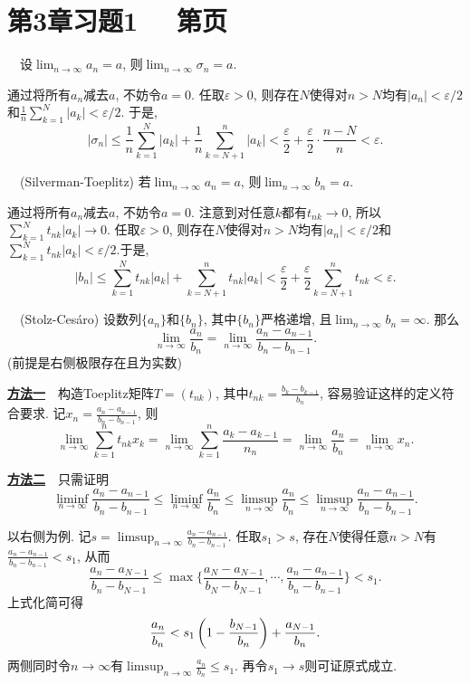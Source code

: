\newpage
\section*{第3章习题1 ~~\small 第\pageref{sec:ex3.1}页}

~~设$\lim_{n\to \infty} a_n=a$, 则$\lim_{n\to \infty} \sigma _n=a$. 

\begin{exsolution}
	通过将所有$a_n$减去$a$, 不妨令$a=0$. 任取$\varepsilon >0$, 则存在$N$使得对$n>N$均有$|a_n|<\varepsilon /2$和$\frac{1}{n} \sum_{k=1}^{N} |a_k| <\varepsilon /2$. 于是, $$|\sigma _n| \leq \frac{1}{n} \sum_{k=1}^{N} |a_k| + \frac{1}{n} \sum_{k=N+1}^{n} |a_k| < \frac{\varepsilon}{2} + \frac{\varepsilon}{2} \cdot \frac{n-N}{n} < \varepsilon .$$
\end{exsolution}

~~(Silverman-Toeplitz) 若$\lim_{n\to \infty} a_n=a$, 则$\lim_{n\to \infty} b_n=a$. 

\begin{exsolution}
	通过将所有$a_n$减去$a$, 不妨令$a=0$. 注意到对任意$k$都有$t_{nk} \to 0$, 所以$\sum_{k=1}^{N} t_{nk}|a_k| \to 0$. 任取$\varepsilon >0$, 则存在$N$使得对$n>N$均有$|a_n|<\varepsilon /2$和$\sum_{k=1}^{N} t_{nk}|a_k| < \varepsilon /2$.于是, 
	$$|b_n| \leq \sum_{k=1}^{N} t_{nk} |a_k| + \sum_{k=N+1}^{n}t_{nk}|a_k| < \frac{\varepsilon}{2} + \frac{\varepsilon}{2}\sum_{k=N+1}^{n}t_{nk} < \varepsilon .$$
\end{exsolution}

~~(Stolz-Cesáro) 设数列$\{ a_n \}$和$\{ b_n \}$, 其中$\{ b_n \}$严格递增, 且$\lim_{n\to \infty} b_n = \infty$. 那么$$\lim_{n\to \infty} \frac{a_n}{b_n} = \lim_{n\to \infty} \frac{a_n-a_{n-1}}{b_n-b_{n-1}}. $$
(前提是右侧极限存在且为实数)

\begin{exsolution}
	\underline{\textbf{方法一}}~~构造Toeplitz矩阵$T=(t_{nk})$, 其中$t_{nk}=\frac{b_k-b_{k-1}}{b_n}$, 容易验证这样的定义符合要求. 记$x_n = \frac{a_n-a_{n-1}}{b_n-b_{n-1}}$, 则$$\lim_{n\to \infty} \sum_{k=1}^{n} t_{nk}x_k = \lim_{n\to \infty} \sum_{k=1}^{n} \frac{a_k-a_{k-1}}{n_n} =\lim_{n\to \infty} \frac{a_n}{b_n} = \lim_{n\to \infty} x_n. $$
	
	\underline{\textbf{方法二}}~~只需证明$$\liminf_{n\to \infty} \frac{a_n-a_{n-1}}{b_n-b_{n-1}} \leq \liminf_{n\to \infty} \frac{a_n}{b_n} \leq \limsup_{n\to \infty} \frac{a_n}{b_n} \leq \limsup_{n\to \infty} \frac{a_n-a_{n-1}}{b_n-b_{n-1}}.$$
	
	以右侧为例. 记$s = \limsup_{n\to \infty} \frac{a_n-a_{n-1}}{b_n-b_{n-1}}$. 任取$s_1>s$, 存在$N$使得任意$n>N$有$\frac{a_n-a_{n-1}}{b_n-b_{n-1}} <s_1$, 从而$$\frac{a_n-a_{N-1}}{b_n-b_{N-1}} \leq \max \big\{ \frac{a_N-a_{N-1}}{b_N-b_{N-1}},\cdots ,\frac{a_n-a_{n-1}}{b_n-b_{n-1}} \big\} < s_1. $$
	上式化简可得$$\frac{a_n}{b_n} < s_1\left( 1-\frac{b_{N-1}}{b_n} \right) + \frac{a_{N-1}}{b_n}. $$
	两侧同时令$n\to \infty$有$\limsup_{n\to \infty} \frac{a_n}{b_n} \leq s_1$. 再令$s_1\to s$则可证原式成立. 
\end{exsolution}

